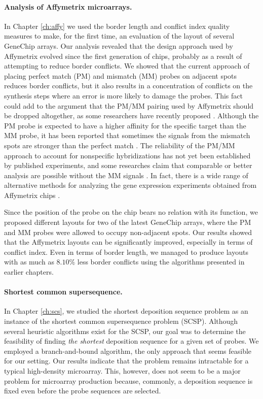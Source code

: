 \paragraph{Analysis of Affymetrix microarrays.} In Chapter \ref{ch:affy} we used
the border length and conflict index quality measures to make, for the first time, an
evaluation of the layout of several GeneChip arrays. Our analysis
revealed that the design approach used by Affymetrix
evolved since the first generation of chips, probably as a result of attempting
to reduce border conflicts. We showed that the current approach of placing
perfect match (PM) and mismatch (MM) probes on adjacent spots reduces
border conflicts, but it also results in a concentration of
conflicts on the synthesis steps where an error is more likely to damage the
probes. This fact could add to the argument that the PM/MM pairing used by
Affymetrix should be dropped altogether, as some researchers have recently
proposed \citep{Lauren2003}. Although the PM probe is expected to have a higher
affinity for the specific target than the MM probe, it has been reported that
sometimes the signals from the mismatch spots are stronger than the perfect
match \citep{Naef2003}. The reliability of the PM/MM approach to account for
nonspecific hybridizations has not yet been established by published
experiments, and some researches claim that comparable or better analysis are
possible without the MM signals \citep{Irizarry2003}. In fact, there is a wide
range of alternative methods for analyzing the gene expression experiments
obtained from Affymetrix chips \citep{Irizarry2006,Millenaar2006}.

Since the position of the probe on the chip bears no relation with its function,
we proposed different layouts for two of the latest GeneChip arrays, where the
PM and MM probes were allowed to occupy non-adjacent spots. Our results showed
that the Affymetrix layouts can be significantly improved, especially in terms
of conflict index. Even in terms of border length, we managed to produce layouts
with as much as $8.10\%$ less border conflicts using the algorithms presented in
earlier chapters.

\paragraph{Shortest common supersequence.}
In Chapter \ref{ch:scs}, we studied the shortest deposition sequence problem as
an instance of the shortest common supersequence problem (SCSP). Although several
heuristic algorithms exist for the SCSP, our goal was to determine the
feasibility of finding \emph{the shortest} deposition sequence for a given set
of probes. We employed a branch-and-bound algorithm, the only approach that
seems feasible for our setting. Our results indicate that the problem remains
intractable for a typical high-density microarray. This, however, does not seem
to be a major problem for microarray production because, commonly, a deposition
sequence is fixed even before the probe sequences are selected.

